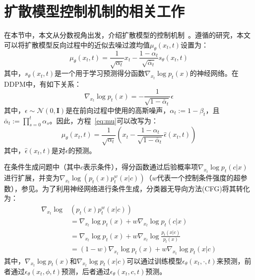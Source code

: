
\newcommand{\myparagraph}[1]{
\vspace{0.2cm}\noindent
\textbullet\hspace{0.1cm}\textbf{#1.}
}
\section{扩散模型控制机制的相关工作}
\label{sec:control}

在本节中，本文从分数视角出发，介绍扩散模型的控制机制~\cite{song2021scorebased}。遵循\cite{luo2022understanding}的研究，本文可以将扩散模型反向过程中的近似去噪过渡均值$\mu_{\theta}(x_t, t)$设置为：
\begin{equation}
\label{eq:mu}
\mu_{\theta}(x_t, t) = \frac{1}{\sqrt{\alpha_t}} x_t - \frac{1 - \alpha_t}{\sqrt{\bar{\alpha}_t}} s_{\theta}(x_t, t) 
\end{equation}
其中，$s_{\theta}(x_t, t)$是一个用于学习预测得分函数$\nabla_{x_{t}}\log p_t(x)$的神经网络。在DDPM中，有如下关系：
\begin{equation}
\nabla_{x_{t}}\log p_t(x)=-\frac{1}{\sqrt{1-\bar{\alpha}_t}}\epsilon
\end{equation}
其中，$\epsilon \sim \mathcal{N}(0, \mathbf{I})$是在前向过程中使用的高斯噪声，$\alpha_t:=1-\beta_t$，且$\bar\alpha_t:=\prod_{s=0}^{t}\alpha_s$。因此，方程~\ref{eq:mu}可以改写为：
\begin{equation}
\label{eq:mu_epsilon}
\mu_{\theta}(x_t, t) = \frac{1}{\sqrt{\alpha_t}} \left(x_t - \frac{1 - \alpha_t}{\sqrt{1 - \bar{\alpha}_t}} \hat\epsilon(x_t, t) \right)
\end{equation}
其中，$\hat\epsilon(x_t, t)$是对$\epsilon$的预测。

在条件生成问题中（其中$c$表示条件），得分函数通过后验概率项$\nabla_{x_{t}}\log p_t(c|x)$进行扩展，并变为$\nabla_{x_{t}}\log \left (p_t(x)p_t^w(x|c) \right)$（$w$代表一个控制条件强度的超参数），参见\cite{dhariwal2021diffusion,ho2022classifier}。为了利用神经网络进行条件生成，分类器无导向方法(CFG)\cite{ho2022classifier}将其转化为：
\begin{align}
    \nabla_{x_{t}}\log &\left (p_t(x)p_t^w(x|c) \right) \nonumber\\
    &= \nabla_{x_{t}}\log p_t(x)+w\nabla_{x_{t}}\log p_t(c|x) \nonumber \\
    & = \nabla_{x_{t}}\log p_t(x) + w\nabla_{x_{t}}\log \frac{p_t(x|c)}{p_t(x)} \nonumber \\
    & = (1-w)\nabla_{x_{t}}\log p_t(x) + w\nabla_{x_{t}}\log p_t(x|c)
\end{align}
其中，$\nabla_{x_{t}}\log p_t(x)$和$\nabla_{x_{t}}\log p_t(x|c)$可以通过训练模型$\epsilon_{\theta}(x_t, \cdot, t)$来预测，前者通过$\epsilon_{\theta}(x_t, \phi, t)$预测，后者通过$\epsilon_{\theta}(x_t, c, t)$预测。

